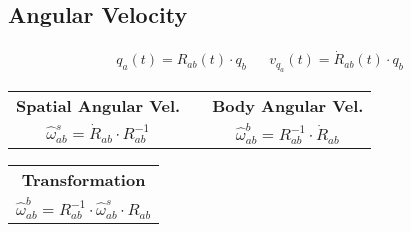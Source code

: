 \subsection{Angular Velocity}
    \vspace{-1em}
    \begin{align*}
        q_a(t) = R_{ab}(t) \cdot q_b && v_{q_a}(t) = \dot{R}_{ab}(t) \cdot q_b
    \end{align*}
    \vspace{0em}
    \begin{center}
        \begin{tabular}{cp{2em}c}
            \textbf{Spatial Angular Vel.} && \textbf{Body Angular Vel.}\\[0.5em]
            $\widehat{\omega}_{ab}^s = \dot{R}_{ab} \cdot R_{ab}^{-1}$&&$\widehat{\omega}_{ab}^b = R_{ab}^{-1} \cdot \dot{R}_{ab}$
        \end{tabular}
    \end{center}
    \begin{center}
        \begin{tabular}{c}
            \textbf{Transformation}\\[0.5em]
            $\widehat{\omega}_{ab}^b = R_{ab}^{-1} \cdot \widehat{\omega}_{ab}^s \cdot R_{ab}$
        \end{tabular}
    \end{center}
    \vspace{-4pt}
